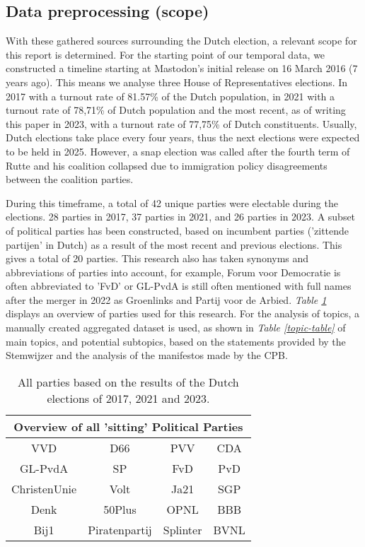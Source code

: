 \subsection{Data preprocessing (scope)}
With these gathered sources surrounding the Dutch election, a relevant scope for this report is determined.
For the starting point of our temporal data, we constructed a timeline starting at Mastodon's initial release on 16 March 2016 (7 years ago).
This means we analyse three House of Representatives elections.
In 2017 with a turnout rate of 81.57\% of the Dutch population, in 2021 with a turnout rate of 78,71\% of Dutch population and the most recent, as of writing this paper in 2023, with a turnout rate of 77,75\% of Dutch constituents.
Usually, Dutch elections take place every four years, thus the next elections were expected to be held in 2025.
However, a snap election was called after the fourth term of Rutte and his coalition collapsed due to immigration policy disagreements between the coalition parties.

During this timeframe, a total of 42 unique parties were electable during the elections.
28 parties in 2017, 37 parties in 2021, and 26 parties in 2023.
A subset of political parties has been constructed, based on incumbent parties ('zittende partijen' in Dutch) as a result of the most recent and previous elections.
This gives a total of 20 parties.
This research also has taken synonyms and abbreviations of parties into account, for example, Forum voor Democratie is often abbreviated to 'FvD' or GL-PvdA is still often mentioned with full names after the merger in 2022 as Groenlinks and Partij voor de Arbied.
\textit{Table \ref{party-table}} displays an overview of parties used for this research.
For the analysis of topics, a manually created aggregated dataset is used, as shown in \textit{Table \ref{topic-table}} of main topics, and potential subtopics, based on the statements provided by the Stemwijzer and the analysis of the manifestos made by the CPB.  \\

\begin{table}
\centering
\begin{tabular}{||c c c c||} 
 \hline
 \multicolumn{4}{|c|}{\textbf{Overview of all 'sitting' Political Parties}} \\
 \hline
 VVD & D66 & PVV & CDA \\
 \hline
 GL-PvdA & SP & FvD & PvD \\
 \hline
 ChristenUnie & Volt & Ja21 & SGP \\
 \hline
 Denk & 50Plus & OPNL & BBB \\
 \hline
 Bij1 & Piratenpartij &  Splinter & BVNL  \\ [1ex] 
 \hline
\end{tabular}
\caption{All parties based on the results of the Dutch elections of 2017, 2021 and 2023.}
\label{party-table}
\end{table}

